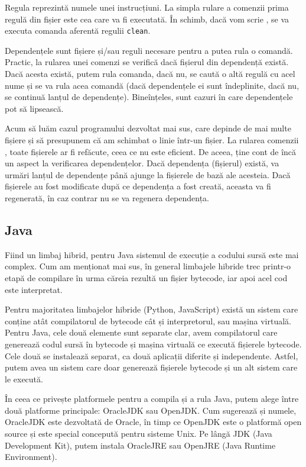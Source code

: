 Regula reprezintă numele unei instrucțiuni. La simpla rulare a comenzii 
prima regulă din fișier este cea care va fi executată. În schimb, dacă vom scrie
, se va executa comanda aferentă regulii \texttt{clean}.

Dependențele sunt fișiere și/sau reguli necesare pentru a putea rula o comandă.
Practic, la rularea unei comenzi se verifică dacă fișierul din dependență există.
Dacă acesta există, putem rula comanda, dacă nu, se caută o altă regulă cu acel
nume și se va rula acea comandă (dacă dependențele ei sunt îndeplinite, dacă nu,
se continuă lanțul de dependențe). Bineînțeles, sunt cazuri în care dependențele
pot să lipsească.

Acum să luăm cazul programului dezvoltat mai sus, care depinde de mai multe
fișiere și să presupunem că am schimbat o linie într-un fișier. La rularea
comenzii , toate fișierele ar fi refăcute, ceea ce nu este eficient. De
aceea,  ține cont de încă un aspect la verificarea dependențelor. Dacă
dependența (fișierul) există,  va urmări lanțul de dependențe până ajunge la
fișierele de bază ale acesteia. Dacă fișierele au fost modificate după ce
dependența a fost creată, aceasta va fi regenerată, în caz contrar nu se va
regenera dependența.

\subsection{Java}
\label{sec:appdev:dev-env:java}

Fiind un limbaj hibrid, pentru Java sistemul de execuție a codului sursă este
mai complex. Cum am menționat mai sus, în general limbajele hibride trec
printr-o etapă de compilare în urma căreia rezultă un fișier bytecode, iar apoi
acel cod este interpretat.

Pentru majoritatea limbajelor hibride (Python, JavaScript) există un sistem care
conține atât compilatorul de bytecode cât și interpretorul, sau mașina virtuală.
Pentru Java, cele două elemente sunt separate clar, avem compilatorul care
generează codul sursă în bytecode și mașina virtuală ce execută fișierele
bytecode. Cele două se instalează separat, ca două aplicații diferite și
independente. Astfel, putem avea un sistem care doar generează fișierele
bytecode și un alt sistem care le execută.

În ceea ce privește platformele pentru a compila și a rula Java, putem alege
între două platforme principale: OracleJDK sau OpenJDK. Cum sugerează și numele,
OracleJDK este dezvoltată de Oracle, în timp ce OpenJDK este o platformă open
source și este special concepută pentru sisteme Unix. Pe lângă JDK (Java
Development Kit), putem instala OracleJRE sau OpenJRE (Java Runtime
Environment).

